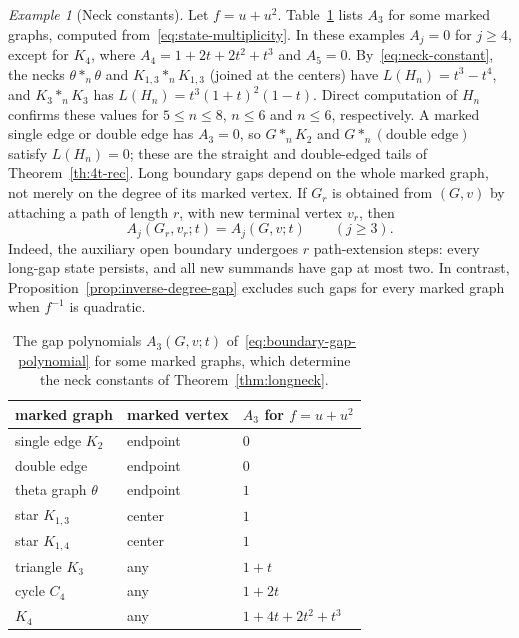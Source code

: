 \documentclass[reqno]{article}
\theoremstyle{plain} %
\theoremstyle{definition}
\theoremstyle{remark}
\newtheorem{example}[theorem]{\sc Example}
\numberwithin{equation}{section}
\begin{document}
\begin{example}[Neck constants]\label{ex:necks}
Let $f=u+u^2$. Table~\ref{tab:neck-A3} lists $A_3$ for some marked
graphs, computed from~\eqref{eq:state-multiplicity}. In these examples
$A_j=0$ for $j\ge4$, except for $K_4$, where $A_4=1+2t+2t^2+t^3$ and
$A_5=0$. By~\eqref{eq:neck-constant}, the necks $\theta\ast_n\theta$ and
$K_{1,3}\ast_nK_{1,3}$ (joined at the centers) have
$L(H_n)=t^3-t^4$, and $K_3\ast_nK_3$ has
$L(H_n)=t^3(1+t)^2(1-t)$. Direct computation of $H_n$ confirms these
values for $5\le n\le8$, $n\le6$ and $n\le6$, respectively. A marked
single edge or double edge has $A_3=0$, so $G\ast_n K_2$ and
$G\ast_n(\text{double edge})$ satisfy $L(H_n)=0$; these are the
straight and double-edged tails of Theorem~\ref{th:4t-rec}.
Long boundary gaps depend on the whole marked graph, not merely on
the degree of its marked vertex. If $G_r$ is obtained from $(G,v)$ by
attaching a path of length $r$, with new terminal vertex $v_r$, then
\[
 A_j(G_r,v_r;t)=A_j(G,v;t)\qquad(j\ge3).
\]
Indeed, the auxiliary open boundary undergoes $r$ path-extension steps:
every long-gap state persists, and all new summands have gap at most two.
In contrast, Proposition~\ref{prop:inverse-degree-gap} excludes such gaps
for every marked graph when $f^{-1}$ is quadratic.
\end{example}

\begin{table}[htbp]
\centering\renewcommand{\arraystretch}{1.12}
\begin{tabular}{lll}\toprule
marked graph & marked vertex & $A_3$ for $f=u+u^2$\\\midrule
single edge $K_2$ & endpoint & $0$\\
double edge & endpoint & $0$\\
theta graph $\theta$ & endpoint & $1$\\
star $K_{1,3}$ & center & $1$\\
star $K_{1,4}$ & center & $1$\\
triangle $K_3$ & any & $1+t$\\
cycle $C_4$ & any & $1+2t$\\
$K_4$ & any & $1+4t+2t^2+t^3$\\\bottomrule
\end{tabular}
\caption{The gap polynomials $A_3(G,v;t)$ of~\eqref{eq:boundary-gap-polynomial}
for some marked graphs, which determine the neck constants of
Theorem~\ref{thm:longneck}.}
\label{tab:neck-A3}
\end{table}
\end{document}
